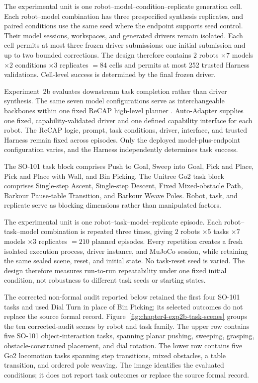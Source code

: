 The experimental unit is one
robot--model--condition--replicate generation cell. Each robot--model
combination has three prespecified synthesis replicates, and paired conditions
use the same seed where the endpoint supports seed control. Their model
sessions, workspaces, and generated drivers remain isolated. Each cell permits
at most three frozen driver submissions: one initial submission and up to two
bounded corrections. The design therefore contains
$2$ robots $\times 7$ models $\times 2$ conditions $\times 3$ replicates
$=84$ cells and permits at most 252 trusted Harness validations. Cell-level
success is determined by the final frozen driver.

Experiment~2b evaluates downstream task completion rather than driver
synthesis. The same seven model configurations serve as interchangeable
backbones within one fixed ReCAP high-level planner
\citep{zhang2025recap}. Auto-Adapter supplies one fixed,
capability-validated driver and one defined capability interface for each
robot. The ReCAP logic, prompt, task conditions, driver, interface, and trusted
Harness remain fixed across episodes. Only the deployed model-plus-endpoint
configuration varies, and the Harness independently determines task success.

The SO-101 task block comprises Push to Goal, Sweep into Goal, Pick and Place,
Pick and Place with Wall, and Bin Picking. The Unitree Go2 task block comprises
Single-step Ascent, Single-step Descent, Fixed Mixed-obstacle Path, Barkour
Pause-table Transition, and Barkour Weave Poles. Robot, task, and replicate
serve as blocking dimensions rather than manipulated factors.

The experimental unit is one
robot--task--model--replicate episode. Each robot--task--model combination is
repeated three times, giving
$2$ robots $\times 5$ tasks $\times 7$ models $\times 3$ replicates
$=210$ planned episodes. Every repetition creates a fresh isolated execution
process, driver instance, and MuJoCo session, while retaining the same sealed
scene, reset, and initial state. No task-reset seed is varied. The design
therefore measures run-to-run repeatability under one fixed initial condition,
not robustness to different task seeds or starting states.

The corrected non-formal audit reported below retained the first four
SO-101 tasks and used Dial Turn in place of Bin Picking; its selected
outcomes do not replace the source formal record.
Figure~\ref{fig:chapter4-exp2b-task-scenes} groups the ten corrected-audit
scenes by robot and task family. The upper row contains five SO-101
object-interaction tasks, spanning planar pushing, sweeping, grasping,
obstacle-constrained placement, and dial rotation. The lower row contains five
Go2 locomotion tasks spanning step transitions, mixed obstacles, a table
transition, and ordered pole weaving. The image identifies the evaluated
conditions; it does not report task outcomes or replace the source formal
record.

